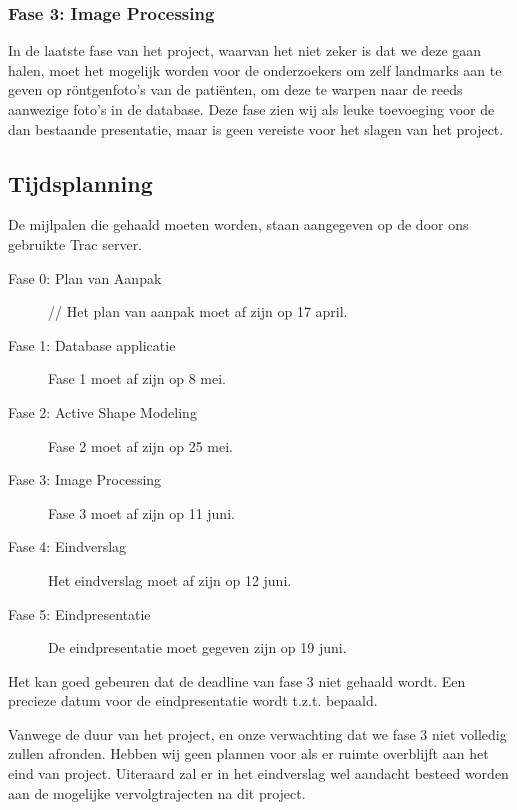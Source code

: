 \subsubsection{Fase 3: Image Processing}
In de laatste fase van het project, waarvan het niet zeker is dat we deze gaan halen, moet het mogelijk worden voor de onderzoekers om zelf landmarks aan te geven op r\"ontgenfoto's van de pati\"enten, om deze te warpen naar de reeds aanwezige foto's in de database. Deze fase zien wij als leuke toevoeging voor de dan bestaande presentatie, maar is geen vereiste voor het slagen van het project.

\subsection{Tijdsplanning}

De mijlpalen die gehaald moeten worden, staan aangegeven op de door ons gebruikte Trac server.
\begin{description}
	\item[Fase 0: Plan van Aanpak] //
Het plan van aanpak moet af zijn op 17 april.
	\item[Fase 1: Database applicatie] Fase 1 moet af zijn op 8 mei.
	\item[Fase 2: Active Shape Modeling] Fase 2 moet af zijn op 25 mei.
	\item[Fase 3: Image Processing] Fase 3 moet af zijn op 11 juni.
	\item[Fase 4: Eindverslag] Het eindverslag moet af zijn op 12 juni.
	\item[Fase 5: Eindpresentatie] De eindpresentatie moet gegeven zijn op 19 juni.
\end{description}
Het kan goed gebeuren dat de deadline van fase 3 niet gehaald wordt.
Een precieze datum voor de eindpresentatie wordt t.z.t. bepaald.

Vanwege de duur van het project, en onze verwachting dat we fase 3 niet volledig zullen afronden. Hebben wij geen plannen voor als er ruimte overblijft aan het eind van project. Uiteraard zal er in het eindverslag wel aandacht besteed worden aan de mogelijke vervolgtrajecten na dit project.
